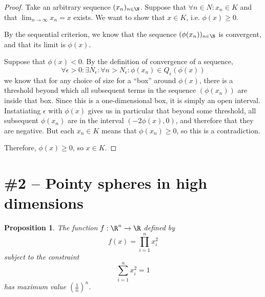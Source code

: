 \documentclass[letterpaper,11pt]{article}
\newtheorem{prop}{Proposition}
\newcommand{\parens}[1]{\left(#1\right)}
\begin{document}
\begin{proof}
  Take an arbitrary sequence $(x_n)_{n\in\N}$. Suppose that
  $\forall n \in N : x_n \in K$ and that $\lim_{n\to\infty} x_n = x$ exists.
  We want to show that $x \in K$, i.e. $\phi(x) \geq 0$.

  By the sequential criterion, we know that the sequence $(\phi(x_n))_{n\in\N}$
  is convergent, and that its limit is $\phi(x)$.

  Suppose that $\phi(x) < 0$. By the definition of convergence of a sequence,
  \begin{equation*}
    \forall \epsilon > 0 : \exists N_\epsilon : \forall n > N_\epsilon :
    \phi(x_n) \in Q_\epsilon(\phi(x))
  \end{equation*}
  we know that for any choice of size for a ``box'' around $\phi(x)$, there is
  a threshold beyond which all subsequent terms in the sequence $(\phi(x_n))$
  are inside that box. Since this is a one-dimensional box, it is simply an
  open interval. Instatiating $\epsilon$ with $\phi(x)$ gives us in particular
  that beyond some threshold, all subsequent $\phi(x_n)$ are in the interval
  $(-2\phi(x), 0)$, and therefore that they are negative. But each $x_n \in K$
  means that $\phi(x_n) \geq 0$, so this is a contradiction.

  Therefore, $\phi(x) \geq 0$, so $x \in K$.
\end{proof}

\section*{\#2 -- Pointy spheres in high dimensions}

\begin{prop}
  The function $f : \R^n \to \R$ defined by
  \begin{equation*}
    f(x) = \prod_{i=1}^n x_i^2
  \end{equation*}
  subject to the constraint
  \begin{equation*}
    \sum_{i=1}^n x_i^2 = 1
  \end{equation*}
  has maximum value $\parens{\frac{1}{n}}^n$.
\end{prop}
\end{document}

